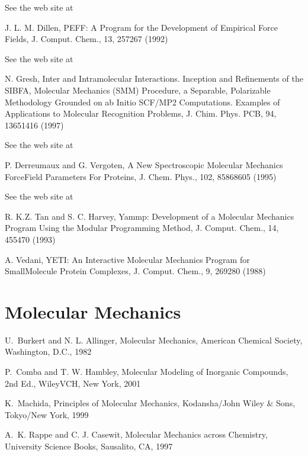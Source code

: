 \documentclass[letterpaper,11pt,english]{sphinxmanual}
\begin{document}
     See the web site at 

     J. L. M. Dillen, PEFF: A Program for the Development of Empirical Force Fields, J. Comput. Chem., 13, 257\sphinxhyphen{}267 (1992)

     See the web site at 

     N. Gresh, Inter\sphinxhyphen{} and Intramolecular Interactions. Inception and Refinements of the SIBFA, Molecular Mechanics (SMM) Procedure, a Separable, Polarizable Methodology Grounded on ab Initio SCF/MP2 Computations. Examples of Applications to Molecular Recognition Problems, J. Chim. Phys. PCB, 94, 1365\sphinxhyphen{}1416 (1997)

     See the web site at 

     P. Derreumaux and G. Vergoten, A New Spectroscopic Molecular Mechanics Force\sphinxhyphen{}Field \sphinxhyphen{} Parameters For Proteins, J. Chem. Phys., 102, 8586\sphinxhyphen{}8605 (1995)

     See the web site at 

     R. K.\sphinxhyphen{}Z. Tan and S. C. Harvey, Yammp: Development of a Molecular Mechanics Program Using the Modular Programming Method, J. Comput. Chem., 14, 455\sphinxhyphen{}470 (1993)

     A. Vedani, YETI: An Interactive Molecular Mechanics Program for Small\sphinxhyphen{}Molecule Protein Complexes, J. Comput. Chem., 9, 269\sphinxhyphen{}280 (1988)


\section{Molecular Mechanics}
\label{\detokenize{text/references:molecular-mechanics}}
U. Burkert and N. L. Allinger, Molecular Mechanics, American Chemical Society, Washington, D.C., 1982

P. Comba and T. W. Hambley, Molecular Modeling of Inorganic Compounds, 2nd Ed., Wiley\sphinxhyphen{}VCH, New York, 2001

K. Machida, Principles of Molecular Mechanics, Kodansha/John Wiley \& Sons, Tokyo/New York, 1999

A. K. Rappe and C. J. Casewit, Molecular Mechanics across Chemistry, University Science Books, Sausalito, CA, 1997
\end{document}
